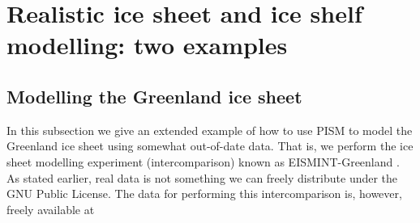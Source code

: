 \documentclass[11pt,final]{amsart}
\begin{document}

\clearpage\newpage
\section{Realistic ice sheet and ice shelf modelling: two examples}\label{sect:real}

\subsection{Modelling the Greenland ice sheet}  In this subsection we give an extended example of how to use PISM to model the Greenland ice sheet using somewhat out-of-date data.  That is, we perform the ice sheet modelling experiment (intercomparison) known as EISMINT-Greenland \cite{RitzEISMINT}.  As stated earlier, real data is not something we can freely distribute under the GNU Public License.  The data for performing this intercomparison is, however, freely available at
\medskip
\end{document}
